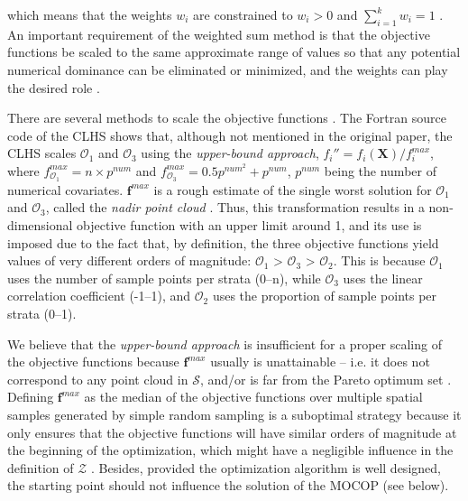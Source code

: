 \noindent which means that the weights $w_i$ are constrained to $w_i > 0$ and $\sum_{i=1}^{k} w_i = 1$ 
\cite{MarlerEtAl2005, MarlerEtAl2009}. An important requirement of the weighted sum method is that the 
objective functions be scaled to the same approximate range of values so that any potential numerical 
dominance can be eliminated or minimized, and the weights can play the desired role \cite{MarlerEtAl2005, 
MarlerEtAl2009}. 

There are several methods to scale the objective functions \cite{MarlerEtAl2005}. The Fortran source code of 
the CLHS shows that, although not mentioned in the original paper, the CLHS scales $\mathcal{O}_1$ and 
$\mathcal{O}_3$ using the \emph{upper-bound approach}, $f_i'' =f_i(\boldsymbol{X}) / f_i^{max}$, where 
$f^{max}_{\mathcal{O}_1} = n \times p^{num}$ and $f^{max}_{\mathcal{O}_3} = 0.5p^{num^2} + p^{num}$, 
$p^{num}$ being the number of numerical covariates. $\boldsymbol{f}^{max}$ is a rough estimate of the 
single worst solution for $\mathcal{O}_1$ and $\mathcal{O}_3$, called the \emph{nadir point cloud} 
\cite{MarlerEtAl2004}. Thus, this transformation results in a non-dimensional objective function with an upper 
limit around 1, and its use is imposed due to the fact that, by definition, the three objective functions yield 
values of very different orders of magnitude: $\mathcal{O}_1$ > $\mathcal{O}_3$ > $\mathcal{O}_2$. This is 
because $\mathcal{O}_1$ uses the number of sample points per strata (0--n), while $\mathcal{O}_3$ uses the 
linear correlation coefficient (-1--1), and $\mathcal{O}_2$ uses the proportion of sample points per strata 
(0--1).

We believe that the \emph{upper-bound approach} is insufficient for a proper scaling of the objective 
functions because $\boldsymbol{f}^{max}$ usually is unattainable -- i.e. it does not correspond to any point 
cloud in $\mathcal{S}$, and/or is far from the Pareto optimum set \cite{MarlerEtAl2004}. Defining 
$\boldsymbol{f}^{max}$ as the median of the objective functions over multiple spatial samples generated by 
simple random sampling \cite{CliffordEtAl2014} is a suboptimal strategy because it only ensures that the 
objective functions will have similar orders of magnitude at the beginning of the optimization, which might 
have a negligible influence in the definition of $\mathcal{Z}$ \cite{MarlerEtAl2005}. Besides, provided the 
optimization algorithm is well designed, the starting point should not influence the solution of the MOCOP 
(see below).

